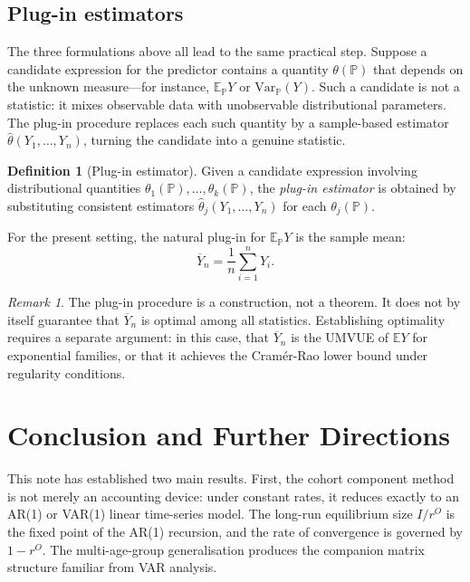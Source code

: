 \documentclass[a4paper,oneside,12pt]{extarticle}
\theoremstyle{plain}
\theoremstyle{definition}
\newtheorem{definition}[proposition]{Definition}
\theoremstyle{remark}
\newtheorem{remark}[proposition]{Remark}
\newcommand*{\E}{\mathbb{E}}
\newcommand*{\mP}{\mathbb{P}}
\begin{document}
\subsection{Plug-in estimators}

The three formulations above all lead to the same practical step. Suppose
a candidate expression for the predictor contains a quantity
$\theta(\mP)$ that depends on the unknown measure---for instance,
$\E_\mP Y$ or $\mathrm{Var}_\mP(Y)$. Such a candidate is not a
statistic: it mixes observable data with unobservable distributional
parameters. The plug-in procedure replaces each such quantity by a
sample-based estimator $\widehat\theta(Y_1,\ldots,Y_n)$, turning the
candidate into a genuine statistic.

\begin{definition}[Plug-in estimator]
Given a candidate expression involving distributional quantities
$\theta_1(\mP),\ldots,\theta_k(\mP)$, the \emph{plug-in estimator}
is obtained by substituting consistent estimators
$\widehat\theta_j(Y_1,\ldots,Y_n)$ for each $\theta_j(\mP)$.
\end{definition}

For the present setting, the natural plug-in for $\E_\mP Y$ is the
sample mean:
\[
\overline{Y}_n = \frac{1}{n}\sum_{i=1}^n Y_i.
\]

\begin{remark}
The plug-in procedure is a construction, not a theorem. It does not by
itself guarantee that $\overline{Y}_n$ is optimal among all statistics.
Establishing optimality requires a separate argument: in this case, that
$\overline{Y}_n$ is the UMVUE of $\E Y$ for exponential families, or that
it achieves the Cramér-Rao lower bound under regularity conditions.
\end{remark}


\section{Conclusion and Further Directions}

This note has established two main results. First, the cohort component
method is not merely an accounting device: under constant rates, it
reduces exactly to an AR(1) or VAR(1) linear time-series model. The
long-run equilibrium size $I/r^O$ is the fixed point of the AR(1)
recursion, and the rate of convergence is governed by $1-r^O$. The
multi-age-group generalisation produces the companion matrix structure
familiar from VAR analysis.
\end{document}
